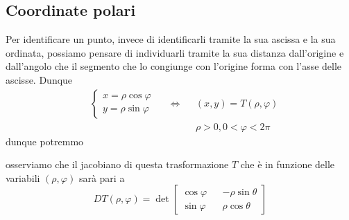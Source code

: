 \subsection{Coordinate polari}
Per identificare un punto, invece di identificarli tramite la sua ascissa e la sua ordinata, possiamo pensare di individuarli tramite la sua distanza dall'origine e dall'angolo che il segmento che lo congiunge con
l'origine forma con l'asse delle ascisse. Dunque
\begin{align*}
&\begin{cases}
	x = \rho \cos{\varphi} \\
	y = \rho \sin{\varphi}
\end{cases} & &\iff & &(x, y) = T(\rho, \varphi) \\
& & & & &\rho > 0, 0 < \varphi < 2\pi
\end{align*}
dunque potremmo 
\begin{figure}[H]
	\centering
\end{figure}
osserviamo che il jacobiano di questa trasformazione $T$ che è in funzione delle variabili $(\rho, \varphi)$ sarà pari a
$$
DT(\rho, \varphi) = \det \begin{bmatrix} \cos{\varphi} && -\rho \sin{\theta} \\
	\sin{\varphi} && \rho \cos{\theta}
\end{bmatrix} 
$$
